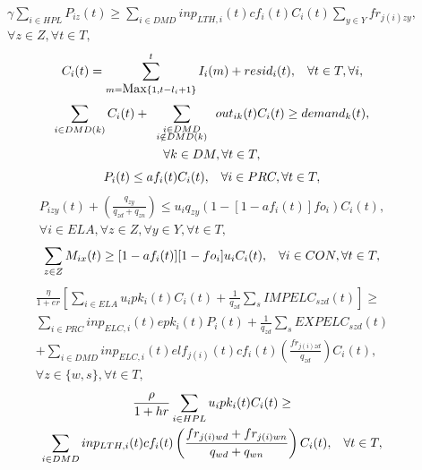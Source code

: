 \begin{multline*}
\gamma \sum_{i\in HPL} P_{iz}(t) \geq \sum_{i\in DMD} inp_{LTH,i}(t) cf_i(t) C_i(t) \sum_{y\in Y} fr_{j(i)zy},\\
 \forall z\in Z, \forall t\in T,
\end{multline*}
\begin{equation*}
C_i(t) = \sum_{m=\mbox{Max}\{1,t-l_i + 1\}}^t I_i(m) + resid_i(t), \hspace{3mm} \forall t \in T, \forall i,
\end{equation*}
\begin{multline*}
\sum_{i\in DMD(k)} C_i(t) + \sum_{{\renewcommand{\arraystretch}{0.2} \begin{array}{c} \scriptstyle i \in DMD \\ \scriptstyle i\notin DMD(k) \end{array}}} out_{ik}(t) C_i(t) \geq demand_k(t),\\
 \forall k \in DM, \forall t \in T,
\end{multline*}
\begin{equation*}
P_i(t) \leq af_i(t)C_i(t), \hspace{3mm} \forall i \in PRC, \forall t \in T,
\end{equation*}
\begin{multline*}
P_{izy}(t) + \left(\frac{q_{zy}}{q_{zd} + q_{zn}}\right) \leq u_i q_{zy}\left( 1- \left[1- af_i(t)\right]fo_i\right)C_i(t),\\
\forall i \in ELA, \forall z \in Z, \forall y\in Y, \forall t \in T,
\end{multline*}
\begin{equation*}
\sum_{z\in Z} M_{ix}(t) \geq [1-af_i(t)][1-fo_i]u_i C_i(t), \hspace{3mm} \forall i \in CON, \forall t \in T,
\end{equation*}
\begin{multline*}
\frac{\eta}{1 + er}\left[ \sum_{i\in ELA} u_i pk_i(t) C_i(t) + \frac{1}{q_{zd}} \sum_s IMPELC_{szd}(t)\right] \geq \\
\sum_{i\in PRC} inp_{ELC,i}(t) epk_i(t) P_i(t) + \frac{1}{q_{zd}} \sum_s EXPELC_{szd}(t)\\
+ \sum_{i\in DMD}  inp_{ELC,i}(t) elf_{j(i)}(t) cf_i(t) \left( \frac{fr_{j(i)zd}}{q_{zd}}\right) C_i(t),\\
\forall z\in \{w,s\}, \forall t\in T,
\end{multline*}
\begin{multline*}
\frac{\rho}{1 + hr} \sum_{i\in HPL} u_i pk_i(t) C_i(t) \geq \\
\sum_{i\in DMD}  inp_{LTH,i}(t) cf_i(t) \left( \frac{fr_{j(i) w d} + fr_{j(i) w n}}{q_{wd} + q_{wn}}\right) C_i(t), \hspace{3mm} \forall t\in T,
\end{multline*}
